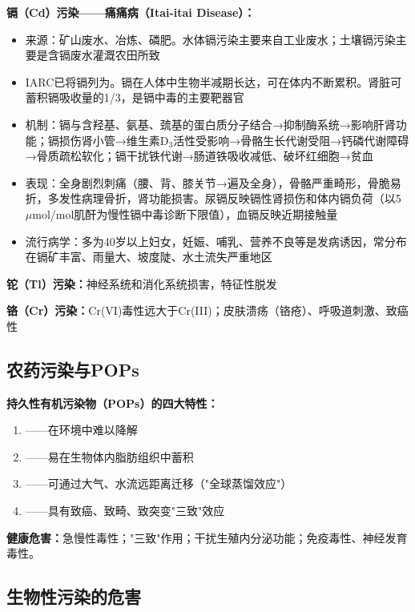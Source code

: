 \begin{keybox}
\textbf{镉（Cd）污染——痛痛病（Itai-itai Disease）：}
\begin{itemize}[leftmargin=*]
    \item 来源：矿山废水、冶炼、磷肥。水体镉污染主要来自工业废水；土壤镉污染主要是含镉废水灌溉农田所致
    \item IARC已将镉列为。镉在人体中生物半减期长达，可在体内不断累积。肾脏可蓄积镉吸收量的1/3，是镉中毒的主要靶器官
    \item 机制：镉与含羟基、氨基、巯基的蛋白质分子结合→抑制酶系统→影响肝肾功能；镉损伤肾小管→维生素D$_3$活性受影响→骨骼生长代谢受阻→钙磷代谢障碍→骨质疏松软化；镉干扰铁代谢→肠道铁吸收减低、破坏红细胞→贫血
    \item 表现：全身剧烈刺痛（腰、背、膝关节→遍及全身），骨骼严重畸形，骨脆易折，多发性病理骨折，肾功能损害。尿镉反映镉性肾损伤和体内镉负荷（以5 $\mu$mol/mol肌酐为慢性镉中毒诊断下限值），血镉反映近期接触量
    \item 流行病学：多为40岁以上妇女，妊娠、哺乳、营养不良等是发病诱因，常分布在镉矿丰富、雨量大、坡度陡、水土流失严重地区
\end{itemize}

\textbf{铊（Tl）污染：}神经系统和消化系统损害，特征性脱发

\textbf{铬（Cr）污染：}Cr(VI)毒性远大于Cr(III)；皮肤溃疡（铬疮）、呼吸道刺激、致癌性
\end{keybox}

\subsection{农药污染与POPs}

\begin{keybox}
\textbf{持久性有机污染物（POPs）的四大特性：}
\begin{enumerate}[leftmargin=*]
    \item {}——在环境中难以降解
    \item {}——易在生物体内脂肪组织中蓄积
    \item {}——可通过大气、水流远距离迁移（"全球蒸馏效应"）
    \item {}——具有致癌、致畸、致突变"三致"效应
\end{enumerate}

\textbf{健康危害：}急慢性毒性；"三致"作用；干扰生殖内分泌功能；免疫毒性、神经发育毒性。
\end{keybox}

\subsection{生物性污染的危害}

